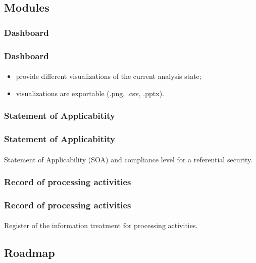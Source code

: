 \subsection{Modules}
\subsubsection{Dashboard}
\begin{frame}
    \frametitle{Dashboard}
    \framesubtitle{}
    \begin{itemize}
        \item provide different visualizations of the current analysis state;
        \item visualizations are exportable (.png, .csv, .pptx).
    \end{itemize}
\end{frame}

\subsubsection{Statement of Applicabitity}
\begin{frame}
    \frametitle{Statement of Applicabitity}
    \framesubtitle{}
    Statement of Applicability (SOA) and compliance level for a referential security.
\end{frame}

\subsubsection{Record of processing activities}
\begin{frame}
    \frametitle{Record of processing activities}
    \framesubtitle{}
    Register of the information treatment for processing activities.
\end{frame}



\subsection{Roadmap}
